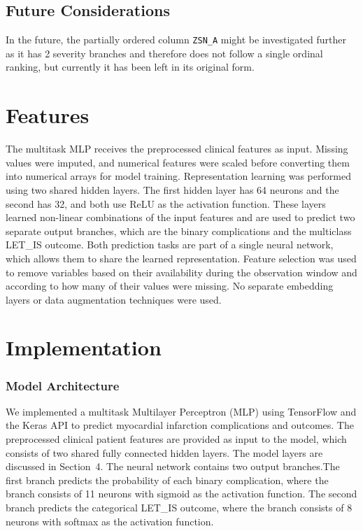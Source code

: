 \documentclass[11pt]{article}
\begin{document}
\subsection{Future Considerations}

In the future, the partially ordered column \texttt{ZSN\_A} might be investigated further as it has 2 severity branches and therefore does not follow a single ordinal ranking, but currently it has been left in its original form.

\section{Features}

The multitask MLP receives the preprocessed clinical features as input. Missing values were imputed, and numerical features were scaled before converting them into numerical arrays for model training. Representation learning was performed using two shared hidden layers. The first hidden layer has 64 neurons and the second has 32, and both use ReLU as the activation function. These layers learned non-linear combinations of the input features and are used to predict two separate output branches, which are the binary complications and the multiclass LET\_IS outcome. Both prediction tasks are part of a single neural network, which allows them to share the learned representation. Feature selection was used to remove variables based on their availability during the observation window and according to how many of their values were missing. No separate embedding layers or data augmentation techniques were used.

\section{Implementation}

\subsubsection{Model Architecture}

We implemented a multitask Multilayer Perceptron (MLP) using TensorFlow and the Keras API to predict myocardial infarction complications and outcomes. The preprocessed clinical patient features are provided as input to the model, which consists of two shared fully connected hidden layers. The model layers are discussed in Section~4. The neural network contains two output branches.The first branch predicts the probability of each binary complication, where the branch consists of 11 neurons with sigmoid as the activation function. The second branch predicts the categorical LET\_IS outcome, where the branch consists of 8 neurons with softmax as the activation function. 
\end{document}
